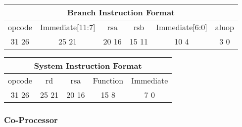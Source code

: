 \documentclass[letterpaper, 11pt]{article}
\begin{document}
\begin{center}
		\begin{tabular}{|c|c|c|c|c|c|}
			\multicolumn{6}{c}{Branch Instruction Format}\\ \hline
				\hspace{2pt} opcode \hspace{2pt} & \hspace{5pt} Immediate[11:7] \hspace{5pt} &  \hspace{4pt} rsa \hspace{4pt} & \hspace{4pt}rsb  \hspace{4pt}& \hspace{10pt}Immediate[6:0]  \hspace{10pt} & \hspace{3pt} aluop \hspace{3pt}   \\	\hline
			31 \hfill 26& 25 \hfill 21 &20 \hfill  16& 15 \hfill  11&10 \hfill   4&3 \hfill   0\\ \hline
		
	\end{tabular}
\end{center}

\begin{center}
	\begin{tabular}{|c|c|c|c|c|}
		\multicolumn{5}{c}{System Instruction Format}\\ \hline
		\hspace{2pt} opcode \hspace{2pt} & \hspace{5pt} rd \hspace{5pt} &  \hspace{4pt} rsa \hspace{4pt} & \hspace{10pt}Function  \hspace{10pt} & \hspace{8pt} Immediate \hspace{8pt}   \\	\hline
		31 \hfill 26& 25 \hfill 21 &20 \hfill  16& 15 \hfill  8&7 \hfill   0\\ \hline
		
	\end{tabular}
\end{center}

\subsubsection{Co-Processor}
\end{document}
